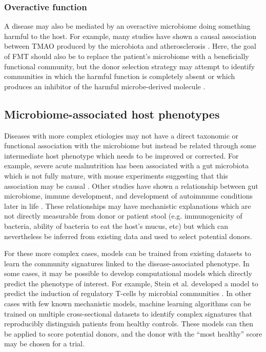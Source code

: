 \subsubsection{Overactive function}

A disease may also be mediated by an overactive microbiome doing something harmful to the host.
For example, many studies have shown a causal association between TMAO produced by the microbiota and atherosclerosis \cite{Koeth2013,Wang2015}.
Here, the goal of FMT should also be to replace the patient's microbiome with a beneficially functional community, but the donor selection strategy may attempt to identify communities in which the harmful function is completely absent or which produces an inhibitor of the harmful microbe-derived molecule \cite{Wang2015}.

\subsection{Microbiome-associated host phenotypes}

Diseases with more complex etiologies may not have a direct taxonomic or functional association with the microbiome but instead be related through some intermediate host phenotype which needs to be improved or corrected.
For example, severe acute malnutrition has been associated with a gut microbiota which is not fully mature, with mouse experiments suggesting that this association may be causal \cite{Blanton2016,Subramanian2014}.
Other studies have shown a relationship between gut microbiome, immune development, and development of autoimmune conditions later in life \cite{Stokholm2018,Cox2014,Kostic2015}.
These relationships may have mechanistic explanations which are not directly measurable from donor or patient stool (e.g. immunogenicity of bacteria, ability of bacteria to eat the host's mucus, etc) but which can nevertheless be inferred from existing data and used to select potential donors.

For these more complex cases, models can be trained from existing datasets to learn the community signatures linked to the disease-associated phenotype. In some cases, it may be possible to develop computational models which directly predict the phenotype of interest.
For example, Stein et al. developed a model to predict the induction of regulatory T-cells by microbial communities \cite{Stein2018}.
In other cases with few known mechanistic models, machine learning algorithms can be trained on multiple cross-sectional datasets to identify complex signatures that reproducibly distinguish patients from healthy controls.
These models can then be applied to score potential donors, and the donor with the ``most healthy'' score may be chosen for a trial.

